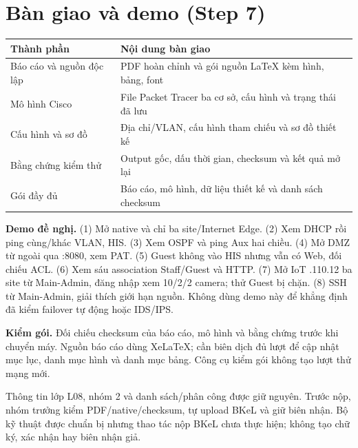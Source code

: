 \documentclass[
  11pt,
]{article}
\begin{document}
\section{Bàn giao và demo (Step 7)}
\par\noindent
{}
\begin{tabularx}{\linewidth}{@{}lX@{}}\toprule
Thành phần & Nội dung bàn giao\\\midrule
Báo cáo và nguồn độc lập & PDF hoàn chỉnh và gói nguồn LaTeX kèm hình, bảng, font\\
Mô hình Cisco & File Packet Tracer ba cơ sở, cấu hình và trạng thái đã lưu\\
Cấu hình và sơ đồ & Địa chỉ/VLAN, cấu hình tham chiếu và sơ đồ thiết kế\\
Bằng chứng kiểm thử & Output gốc, dấu thời gian, checksum và kết quả mở lại\\
Gói đầy đủ & Báo cáo, mô hình, dữ liệu thiết kế và danh sách checksum\\\bottomrule\end{tabularx}\par

\textbf{Demo đề nghị.} (1) Mở native và chỉ ba site/Internet Edge. (2) Xem DHCP rồi ping cùng/khác VLAN, HIS. (3) Xem OSPF và ping Aux hai chiều. (4) Mở DMZ từ ngoài qua :8080, xem PAT. (5) Guest không vào HIS nhưng vẫn có Web, đối chiếu ACL. (6) Xem sáu association Staff/Guest và HTTP. (7) Mở IoT .110.12 ba site từ Main-Admin, đăng nhập xem 10/2/2 camera; thử Guest bị chặn. (8) SSH từ Main-Admin, giải thích giới hạn nguồn. Không dùng demo này để khẳng định đã kiểm failover tự động hoặc IDS/IPS.

\textbf{Kiểm gói.} Đối chiếu checksum của báo cáo, mô hình và bằng chứng trước khi chuyển máy. Nguồn báo cáo dùng XeLaTeX; cần biên dịch đủ lượt để cập nhật mục lục, danh mục hình và danh mục bảng. Công cụ kiểm gói không tạo lượt thử mạng mới.

Thông tin lớp L08, nhóm 2 và danh sách/phân công được giữ nguyên. Trước nộp, nhóm trưởng kiểm PDF/native/checksum, tự upload BKeL và giữ biên nhận. Bộ kỹ thuật được chuẩn bị nhưng thao tác nộp BKeL chưa thực hiện; không tạo chữ ký, xác nhận hay biên nhận giả.

\clearpage
\end{document}

